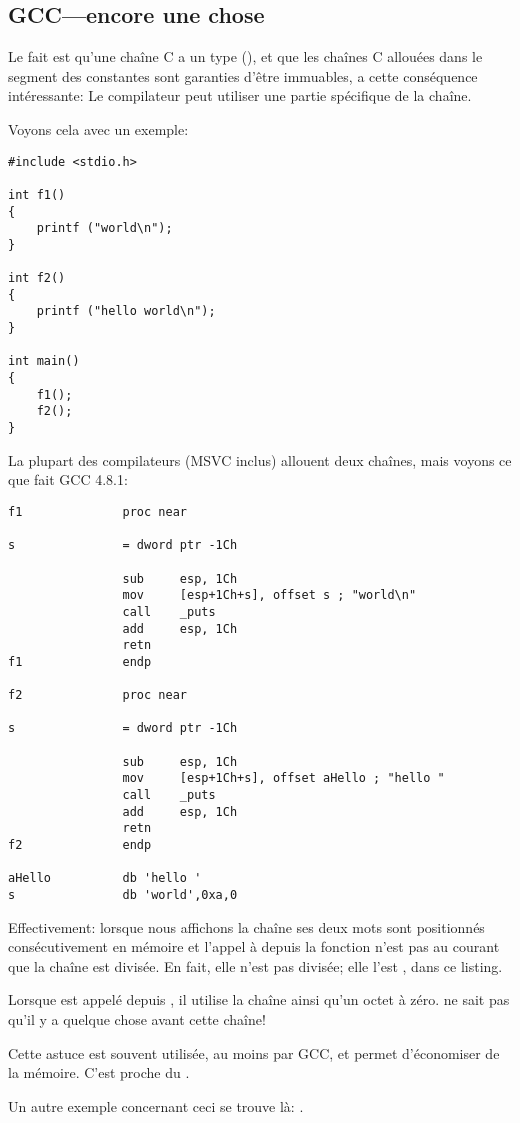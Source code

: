 ﻿\subsection{GCC---encore une chose}
\label{use_parts_of_C_strings}

Le fait est qu'une chaîne C  a un type  (),
et que les chaînes C allouées dans le segment des constantes sont garanties d'être immuables,
a cette conséquence intéressante:
Le compilateur peut utiliser une partie spécifique de la chaîne.

Voyons cela avec un exemple:

\begin{lstlisting}[style=customc]
#include <stdio.h>

int f1()
{
	printf ("world\n");
}

int f2()
{
	printf ("hello world\n");
}

int main()
{
	f1();
	f2();
}
\end{lstlisting}

La plupart des compilateurs \CCpp{} (MSVC inclus) allouent deux chaînes, mais voyons ce que fait GCC 4.8.1:

\begin{lstlisting}[caption=GCC 4.8.1 + IDA listing,style=customasmx86]
f1              proc near

s               = dword ptr -1Ch

                sub     esp, 1Ch
                mov     [esp+1Ch+s], offset s ; "world\n"
                call    _puts
                add     esp, 1Ch
                retn
f1              endp

f2              proc near

s               = dword ptr -1Ch

                sub     esp, 1Ch
                mov     [esp+1Ch+s], offset aHello ; "hello "
                call    _puts
                add     esp, 1Ch
                retn
f2              endp

aHello          db 'hello '
s               db 'world',0xa,0
\end{lstlisting}

Effectivement: lorsque nous affichons la chaîne  ses deux mots sont positionnés
consécutivement en mémoire et l'appel à \puts depuis la fonction 
n'est pas au courant que la chaîne est divisée.
En fait, elle n'est pas divisée; elle l'est , dans ce listing.

Lorsque \puts est appelé depuis , il utilise la chaîne  ainsi qu'un
octet à zéro. \puts ne sait pas qu'il y a quelque chose avant cette chaîne!

Cette astuce est souvent utilisée, au moins par GCC, et permet d'économiser de la mémoire.
C'est proche du . %

Un autre exemple concernant ceci se trouve là: .


